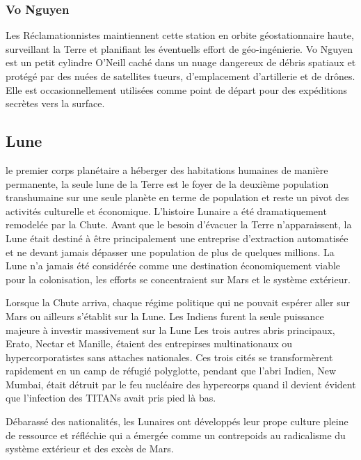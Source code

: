 \subsubsection{Vo Nguyen} \label{sec:vo-nguyen} 

Les Réclamationnistes maintiennent cette station en orbite géostationnaire haute, surveillant la Terre et planifiant les éventuells effort de géo-ingénierie. Vo Nguyen est un petit cylindre O'Neill caché dans un nuage dangereux de débris spatiaux et protégé par des nuées de satellites tueurs, d'emplacement d'artillerie et de drônes. Elle est occasionnellement utilisées comme point de départ pour des expéditions secrètes vers la surface. 

\subsection{Lune} \label{sec:luna} 

le premier corps planétaire a héberger des habitations humaines de manière permanente, la seule lune de la Terre est le foyer de la deuxième population transhumaine sur une seule planète en terme de population et reste un pivot des activités culturelle et économique. L'histoire Lunaire a été dramatiquement remodelée par la Chute. Avant que le besoin d'évacuer la Terre n'apparaissent, la Lune était destiné à être principalement une entreprise d'extraction automatisée et ne devant jamais dépasser une population de plus de quelques millions. La Lune n'a jamais été considérée comme une destination économiquement viable pour la colonisation, les efforts se concentraient sur Mars et le système extérieur. 

Lorsque la Chute arriva, chaque régime politique qui ne pouvait espérer aller sur Mars ou ailleurs s'établit sur la Lune. Les Indiens furent la seule puissance majeure à investir massivement sur la Lune Les trois autres abris principaux, Erato, Nectar et Manille, étaient des entrepirses multinationaux ou hypercorporatistes sans attaches nationales. Ces trois cités se transformèrent rapidement en un camp de réfugié polyglotte, pendant que l'abri Indien, New Mumbai, était détruit par le feu nucléaire des hypercorps quand il devient évident que l'infection des TITANs avait pris pied là bas. 

Débarassé des nationalités, les Lunaires ont développés leur prope culture pleine de ressource et réfléchie qui a émergée comme un contrepoids au radicalisme du système extérieur et des excès de Mars. 

